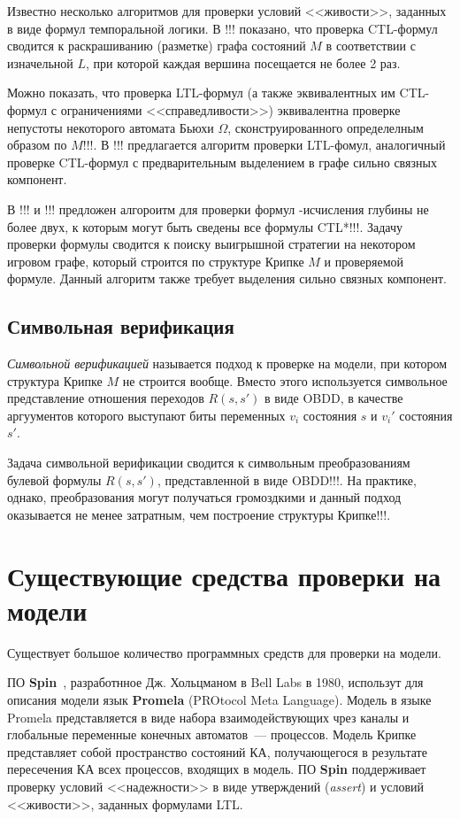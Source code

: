 \documentclass[a4paper,notitlepage,14pt]{article}
\begin{document}
Известно несколько алгоритмов для проверки условий <<живости>>, заданных в виде формул
темпоральной логики. В !!! показано, что проверка CTL-формул сводится к раскрашиванию
(разметке) графа состояний $M$ в соответствии с изначельной $L$, при которой каждая
вершина посещается не более 2 раз. 

Можно показать, что проверка LTL-формул (а также эквивалентных им CTL-формул с
ограничениями <<справедливости>>) эквивалентна проверке непустоты некоторого автомата
Бьюхи $\Omega$, сконструированного определелным образом по $M$!!!. В !!! предлагается
алгоритм проверки LTL-фомул, аналогичный проверке CTL-формул с предварительным выделением
в графе сильно связных компонент.

В !!! и !!! предложен алгороитм для проверки формул \mu-исчисления глубины не более двух,
к которым могут быть сведены все формулы CTL*!!!. Задачу проверки формулы сводится к
поиску выигрышной стратегии на некотором игровом графе, который строится по структуре
Крипке $M$ и проверяемой формуле. Данный алгоритм также требует выделения сильно связных
компонент.

\subsection{Символьная верификация}
\label{sec:symbolic}

\emph{Символьной верификацией} называется подход к проверке на модели, при котором
структура Крипке $M$ не строится вообще. Вместо этого используется символьное
представление отношения переходов $R(s, s')$ в виде OBDD, в качестве аргуументов которого
выступают биты переменных $v_i$ состояния $s$ и $v_i'$ состояния $s'$.

Задача символьной верификации сводится к символьным преобразованиям булевой формулы $R(s,
s')$, представленной в виде OBDD!!!. На практике, однако, преобразования могут получаться
громоздкими и данный подход оказывается не менее затратным, чем построение структуры
Крипке!!!.

\section{Существующие средства проверки на модели}
\label{sec:existing-tools}

Существует большое количество программных средств для проверки на модели. 

ПО \textbf{Spin}~\cite{SpinRoot}, разработнное Дж. Хольцманом в Bell Labs в 1980,
использут для описания модели язык \textbf{Promela} (PROtocol Meta Language). Модель в
языке Promela представляется в виде набора взаимодействующих чрез каналы и глобальные
переменные конечных автоматов~--- процессов. Модель Крипке представляет собой пространство
состояний КА, получающегося в результате пересечения КА всех процессов, входящих в
модель. ПО \textbf{Spin} поддерживает проверку условий <<надежности>> в виде утверждений
(\emph{assert}) и условий <<живости>>, заданных формулами LTL.
\end{document}
